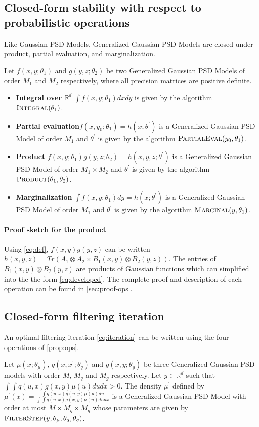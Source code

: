 \subsection{Closed-form stability with respect to probabilistic operations}
Like Gaussian PSD Models, Generalized Gaussian PSD Models are closed under product, partial evaluation, and marginalization.
\begin{proposition}\label{prop:ops}
    Let $f(x, y; \theta_1)$ and $g(y, z; \theta_2)$ be two Generalized Gaussian PSD Models of order $M_1$ and $M_2$ respectively, where all precision matrices are positive definite.
    \begin{itemize}
        \item\textbf{Integral over $\mathbb R^d$} $\int f(x, y; \theta_1)dxdy$ is given by the algorithm $\operatorname{\textsc{Integral}}(\theta_1)$.
        \item\textbf{Partial evaluation}$f(x, y_0; \theta_1) = h(x; \theta^\prime)$ is a Generalized Gaussian PSD Model of order $M_1$ and $\theta^\prime$ is given by the algorithm $\operatorname{\textsc{PartialEval}}(y_0, \theta_1)$.
        \item\textbf{Product} $f(x, y; \theta_1)g(y, z; \theta_2)=h(x, y, z; \theta^\prime)$ is a Generalized Gaussian PSD Model of order $M_1\times M_2$ and $\theta^\prime$ is given by the algorithm $\operatorname{\textsc{Product}}(\theta_1, \theta_2)$.
        \item\textbf{Marginalization} $\int f(x, y; \theta_1)dy=h(x; \theta^\prime)$ is a Generalized Gaussian PSD Model of order $M_1$ and $\theta^\prime$ is given by the algorithm $\operatorname{\textsc{Marginal}}(y, \theta_1)$.
    \end{itemize}
    \end{proposition}
\paragraph{Proof sketch for the product} Using \cref{eq:def}, $f(x, y)g(y, z)$ can be written $h(x, y, z) = Tr(A_1\otimes A_2 \times B_1(x, y) \otimes B_2(y, z))$. The entries of $B_1(x, y) \otimes B_2(y, z)$ are products of Gaussian functions which can simplified into the the form \cref{eq:developed}. The complete proof and description of each operation can be found in \cref{sec:proof-ops}.

\subsection{Closed-form filtering iteration}
An optimal filtering iteration \cref{eq:iteration} can be written using the four operations of \cref{prop:ops}.
\begin{proposition}\label{proposition:psdfilterstep}
Let $\mu(x; \theta_\mu)$, $q(x, x^\prime; \theta_q)$ and $g(x, y; \theta_g)$ be three Generalized Gaussian PSD models with order $M$, $M_q$ and $M_g$ respectively. Let $y\in\mathbb R^d$ such that $\int\int q(u, x)g(x, y)\mu(u)dudx>0$. The density $\mu^\prime$ defined by $\mu^\prime(x) = \frac{\int q(u, x)g(u, y)\mu(u)du}{\int\int q(u, x)g(x, y)\mu(u)dudx}$ is a Generalized Gaussian PSD Model with order at most $M \times M_q \times M_g$ whose parameters are given by $\operatorname{\textsc{FilterStep}}(y, \theta_\mu, \theta_q, \theta_g)$.
\end{proposition}

